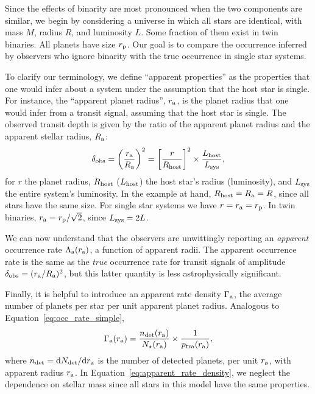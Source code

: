 \documentclass[12pt,modern]{aastex61}
\renewcommand{\a}{_{\rm a}}
\newcommand{\p}{_{\rm p}}
\begin{document}
Since the effects of binarity are most pronounced when the two
components are similar, we begin by considering a universe in which
all stars are identical, with mass $M$, radius $R$, and luminosity
$L$.  Some fraction of them exist in twin binaries.  All planets have
size $r\p$.  Our goal is to compare the occurrence inferred by
observers who ignore binarity with the true occurrence in single star
systems.

To clarify our terminology, we define ``apparent properties'' as the
properties that one would infer about a system under the assumption
that the host star is single. For instance, the  ``apparent planet
radius'', $r\a$, is the planet radius that one would infer from a
transit signal, assuming that the host star is single.  The observed
transit depth is given by the ratio of the apparent planet radius and
the apparent stellar radius, $R\a$:
\begin{equation}
  \delta_{\rm obs}
  = \left(\frac{r\a}{R\a}\right)^2
  = \left[{r\over R_{\rm host}}\right]^2\times {L_{\rm host} \over
          L_{\rm sys}},
  \label{eq:delta_obs_general} 
\end{equation}
for $r$ the planet radius, $R_{\rm host}$ ($L_{\rm host}$) the host
star's radius (luminosity), and $L_{\rm sys}$ the entire system's
luminosity.  In the example at hand, $R_{\rm host} =R\a = R$, since
all stars have the same size. For single star systems we have
$r=r\a=r\p$. In twin binaries, $r\a=r\p/\sqrt{2}$, since $L_{\rm
sys}=2L$.

We can now understand that the observers are unwittingly reporting an
{\it apparent} occurrence rate $\Lambda\a(r\a)$, a function of
apparent radii.  The apparent occurrence rate is the same as the {\it
true} occurrence rate for transit signals of amplitude $\delta_{\rm
obs} = (r\a/R\a)^2$, but this latter quantity is less astrophysically
significant.

Finally, it is helpful to introduce an apparent rate density
$\Gamma\a$, the average number of planets per star per unit apparent
planet radius. Analogous to Equation~\ref{eq:occ_rate_simple},  
\begin{equation}
  \Gamma\a(r\a) = \frac{n_{\rm det}(r\a)}{N_\star(r\a)}
      \times \frac{1}{p_{\rm tra}(r\a)},
\label{eq:apparent_rate_density}
\end{equation}
where $n_{\rm det}={\rm d}N_{\rm det}/{\rm d}r\a$ is the number  of
detected planets, per unit $r\a$, with apparent radius $r\a$.  In
Equation~\ref{eq:apparent_rate_density}, we neglect the dependence on
stellar mass since all stars in this model have the same properties.
\end{document}
